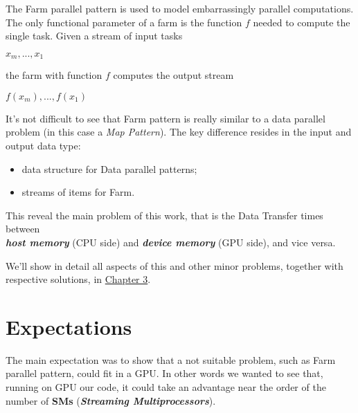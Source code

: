 		The Farm parallel pattern is used to model embarrassingly parallel computations. \\The only functional parameter of a farm is the function \(f\) needed to compute the single task.
		Given a stream of input tasks
		\begin{center}
			\(x_m , . . . , x_1\)\\
		\end{center}
		the farm with function \(f\) computes the output stream
		\begin{center}
			\(f ( x_m ), . . . , f ( x_1 )\)\\
		\end{center}
		\cite{spm}		
		It's not difficult to see that Farm pattern is really similar to a data parallel problem (in this case a \textit{Map Pattern}). The key difference resides in the input and output data type:
		\begin{itemize}			
			\item data structure for Data parallel patterns;
			\item streams of items for Farm.\\
		\end{itemize}
		
		This reveal the main problem of this work, that is the Data Transfer times between\\ \textit{\textbf{host memory}} (CPU side) and \textit{\textbf{device memory}} (GPU side), and vice versa.
		
		We'll show in detail all aspects of this and other minor problems, together with respective solutions, in \hyperref[chap:logic]{Chapter 3}.
	
	\section{Expectations}
		The main expectation was to show that a not suitable problem, such as Farm parallel pattern, could fit in a GPU. 
		In other words we wanted to see that, running on GPU our code, it could take an advantage near the order of the number of \textbf{SMs} (\textit{\textbf{Streaming Multiprocessors}}).\\
		
